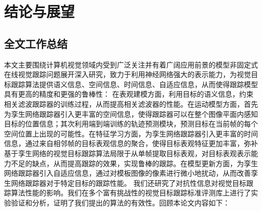 \chapter{结论与展望}\label{chap:conclusion}
\section{全文工作总结}
本文主要围绕计算机视觉领域内受到广泛关注并有着广阔应用前景的模型非固定式在线视觉跟踪问题展开深入研究，致力于利用神经网络强大的表示能力，为视觉目标跟踪算法提供语义信息、空间信息、时间信息、自适应信息，从而使得跟踪模型具有更高的精度和更强的鲁棒性：
在表观建模方面，利用目标的语义信息，约束相关滤波跟踪器的训练过程，从而提高相关滤波器的性能。在运动模型方面，首先为孪生网络跟踪器引入更丰富的空间信息，使得跟踪器可以在整个图像平面内感知目标的位置信息；其次利用端到端训练的轨迹预测模块，预测目标在当前帧的每个空间位置上出现的可能性。在特征学习方面，为孪生网络跟踪器引入更丰富的时间信息，通过来自相邻帧的目标表观信息的聚合，使得目标表观特征更加丰富，弥补基于孪生网络的视觉目标跟踪算法局限于从单帧提取目标表观，对目标表观表示能力不足的缺点，从而提高跟踪的效果，实现鲁棒的跟踪。在模型更新方面，为孪生网络跟踪器引入自适应信息，通过对模板图像的像素进行微小地扰动，从而改善孪生网络跟踪器对于特定目标的跟踪性能。
我们还研究了对抗性信息对视觉目标跟踪算法性能的影响。我们在多个富有挑战性的视觉目标跟踪标准评测库上进行了实验验证和分析，证明了我们提出的算法的有效性。回顾本论文内容如下：

